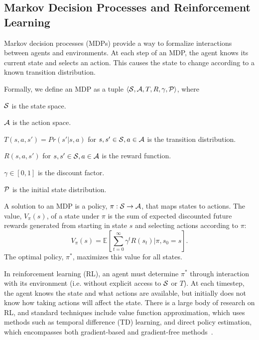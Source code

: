 \subsection{Markov Decision Processes and Reinforcement Learning}
Markov decision processes (MDPs) provide a way to formalize
interactions between agents and environments. At each step of an MDP,
the agent knows its current state and selects an action. This causes the
state to change according to a known transition distribution.
\begin{defn}
Formally, we define an MDP as a tuple $\langle \mathcal{S}, \mathcal{A}, T, R, \gamma, \mathcal{P} \rangle$, where
\begin{tightlist}
\item $\mathcal{S}$ is the state space.
\item $\mathcal{A}$ is the action space.
\item $T(s, a, s') = Pr(s' | s, a)$ for $s, s' \in \mathcal{S}, a \in \mathcal{A}$ is the transition distribution.
\item $R(s, a, s')$ for $s, s' \in \mathcal{S}, a \in \mathcal{A}$ is the reward function.
\item $\gamma \in [0, 1]$ is the discount factor.
\item $\mathcal{P}$ is the initial state distribution.
\end{tightlist}
\end{defn}
A solution to an MDP is a policy, $\pi: \mathcal{S} \rightarrow \mathcal{A}$, that maps states to
actions. The value, $V_{\pi}(s)$, of a state under $\pi$ is the sum of expected
discounted future rewards generated from starting in state $s$ and selecting actions according
to $\pi$:
$$V_{\pi}(s) = \mathbb{E}[\sum_{t=0}^{\infty}\gamma^{t}R(s_{t}) | \pi, s_{0} = s].$$
The optimal policy, $\pi^{*}$, maximizes this value for all states.

In reinforcement learning (RL), an agent must determine $\pi^{*}$
through interaction with its environment (i.e. without explicit access
to $\mathcal{S}$ or $T$). At each timestep, the agent knows the state and what
actions are available, but initially does not know how taking actions will
affect the state. There is a large body of research on RL, and
standard techniques include value function approximation, which uses methods such as temporal difference
(TD) learning, and direct policy estimation, which encompasses both gradient-based
and gradient-free methods~\cite{suttonbarto}.


